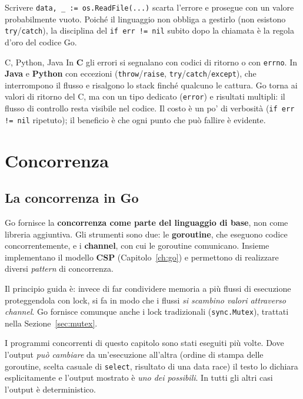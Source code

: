 \documentclass[11pt,a4paper]{report}
\newcommand{\cod}[1]{\texttt{#1}}
\begin{document}
\begin{attenzione}
Scrivere \cod{data, \_ := os.ReadFile(...)} scarta l'errore e prosegue con un
valore probabilmente vuoto. Poiché il linguaggio non obbliga a gestirlo
(non esistono \cod{try}/\cod{catch}), la disciplina del \cod{if err != nil}
subito dopo la chiamata è la regola d'oro del codice Go.
\end{attenzione}

\begin{confronto}{C, Python, Java}
In \textbf{C} gli errori si segnalano con codici di ritorno o con \cod{errno}.
In \textbf{Java} e \textbf{Python} con eccezioni (\cod{throw}/\cod{raise},
\cod{try}/\cod{catch}/\cod{except}), che interrompono il flusso e risalgono lo
stack finché qualcuno le cattura. Go torna ai valori di ritorno del C, ma
con un tipo dedicato (\cod{error}) e risultati multipli: il flusso di
controllo resta visibile nel codice. Il costo è un po' di verbosità
(\cod{if err != nil} ripetuto); il beneficio è che ogni punto che può fallire è
evidente.
\end{confronto}

\chapter{Concorrenza}\label{ch:conc}

\section{La concorrenza in Go}

Go fornisce la \textbf{concorrenza come parte del linguaggio di base}, non come
libreria aggiuntiva. Gli strumenti sono due: le \textbf{goroutine}, che eseguono
codice concorrentemente, e i \textbf{channel}, con cui le goroutine comunicano.
Insieme implementano il modello \textbf{CSP} (Capitolo~\ref{ch:go}) e permettono di
realizzare diversi \emph{pattern} di concorrenza.

Il principio guida è: invece di far condividere memoria a più flussi di
esecuzione proteggendola con lock, si fa in modo che i flussi \emph{si scambino
valori attraverso channel}. Go fornisce comunque anche i lock tradizionali
(\cod{sync.Mutex}), trattati nella Sezione~\ref{sec:mutex}.

\begin{attenzione}
I programmi concorrenti di questo capitolo sono stati eseguiti più volte. Dove
l'output \emph{può cambiare} da un'esecuzione all'altra (ordine di stampa
delle goroutine, scelta casuale di \cod{select}, risultato di una data race) il
testo lo dichiara esplicitamente e l'output mostrato è \emph{uno dei
possibili}. In tutti gli altri casi l'output è deterministico.
\end{attenzione}
\end{document}
